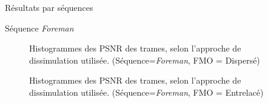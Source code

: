\begin{section}{Résultats par séquences}
\begin{subsection}{Séquence \textit{Foreman}}
\begin{figure} 
\caption[]{Histogrammes des PSNR des trames, selon l'approche de dissimulation
utilisée. (Séquence=\textit{Foreman}, FMO = Dispersé)}
\label{fig-ParSequenceDispersed8}
\end{figure}

\begin{figure} 
\caption[]{Histogrammes des PSNR des trames, selon l'approche de dissimulation
utilisée. (Séquence=\textit{Foreman}, FMO = Entrelacé)}
\label{fig-ParSequenceInterleaved8}
\end{figure}

\FloatBarrier
\end{subsection}

\FloatBarrier
\end{section}